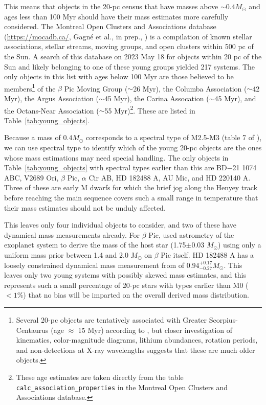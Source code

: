\documentclass[twocolumn,tighten,twocolappendix]{aastex631}
\begin{document}
This means that objects in the 20-pc census that have masses above $\sim0.4 M_\odot$ and ages less than 100 Myr should have their mass estimates more carefully considered. The Montreal Open Clusters and Associations database (\url{https://mocadb.ca/}, Gagn\'e et al., in prep., \citealt{gagne2018}) is a compilation of known stellar associations, stellar streams, moving groups, and open clusters within 500 pc of the Sun. A search of this database on 2023 May 18 for objects within 20 pc of the Sun and likely belonging to one of these young groups yielded 217 systems. The only objects in this list with ages below 100 Myr are those believed to be members\footnote{Several 20-pc objects are tentatively associated with Greater Scorpius-Centaurus (age $\approx$ 15 Myr) according to \cite{kerr2021}, but closer investigation of kinematics, color-magnitude diagrams, lithium abundances, rotation periods, and non-detections at X-ray wavelengths suggests that these are much older objects.} of the $\beta$ Pic Moving Group ($\sim$26 Myr), the Columba Association ($\sim$42 Myr), the Argus Association ($\sim$45 Myr), the Carina Assocation ($\sim$45 Myr), and the Octans-Near Association ($\sim$55 Myr)\footnote{These age estimates are taken directly from the table {\tt calc\_association\_properties} in the Montreal Open Clusters and Associations database.}. These are listed in Table~\ref{tab:young_objects}.

Because a mass of $0.4 M_\odot$ corresponds to a spectral type of M2.5-M3 (table 7 of \citealt{mann2019}), we can use spectral type to identify which of the young 20-pc objects are the ones whose mass estimations may need special handling. The only objects in Table~\ref{tab:young_objects} with spectral types earlier than this are 
BD$-$21 1074 ABC, 
V2689 Ori, 
$\beta$ Pic, 
$\alpha$ Cir AB, 
HD 182488 A, 
AU Mic, 
and HD 220140 A. Three of these are early M dwarfs for which the brief jog along the Henyey track before reaching the main sequence covers such a small range in temperature that their mass estimates should not be unduly affected. 

This leaves only four individual objects to consider, and two of these have dynamical mass measurements already. For $\beta$ Pic, \cite{lacour2021} used astrometry of the exoplanet system to derive the mass of the host star (1.75$\pm$0.03 $M_\odot$) using only a uniform mass prior between 1.4 and 2.0 $M_\odot$ on $\beta$ Pic itself. HD 182488 A has a loosely constrained dynamical mass measurement from \cite{brandt2019} of $0.94^{+0.17}_{-0.27} M_\odot$. 
This leaves only two young systems with possibly skewed mass estimates, and this represents such a small percentage of 20-pc stars with types earlier than M0 ($<1\%$) that no bias will be imparted on the overall derived mass distribution.
\end{document}
